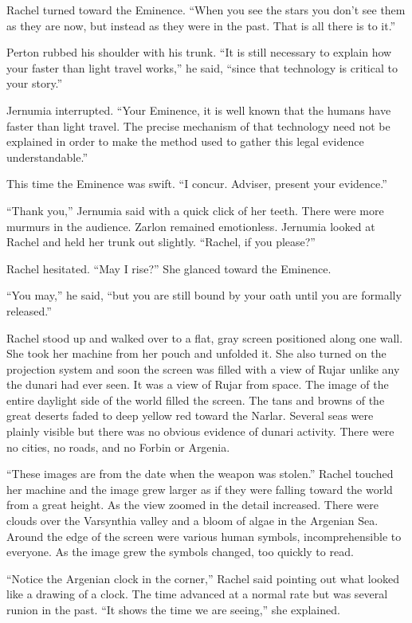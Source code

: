 Rachel turned toward the Eminence. ``When you see the stars you don't see them as they are now,
but instead as they were in the past. That is all there is to it.''

Perton rubbed his shoulder with his trunk. ``It is still necessary to explain how your faster
than light travel works,'' he said, ``since that technology is critical to your story.''

Jernumia interrupted. ``Your Eminence, it is well known that the humans have faster than light
travel. The precise mechanism of that technology need not be explained in order to make the
method used to gather this legal evidence understandable.''

This time the Eminence was swift. ``I concur. Adviser, present your evidence.''

``Thank you,'' Jernumia said with a quick click of her teeth. There were more murmurs in the
audience. Zarlon remained emotionless. Jernumia looked at Rachel and held her trunk out
slightly. ``Rachel, if you please?''

Rachel hesitated. ``May I rise?'' She glanced toward the Eminence.

``You may,'' he said, ``but you are still bound by your oath until you are formally released.''

Rachel stood up and walked over to a flat, gray screen positioned along one wall. She took her
machine from her pouch and unfolded it. She also turned on the projection system and soon the
screen was filled with a view of Rujar unlike any the dunari had ever seen. It was a view of
Rujar from space. The image of the entire daylight side of the world filled the screen. The tans
and browns of the great deserts faded to deep yellow red toward the Narlar. Several seas were
plainly visible but there was no obvious evidence of dunari activity. There were no cities, no
roads, and no Forbin or Argenia.

``These images are from the date when the weapon was stolen.'' Rachel touched her machine and
the image grew larger as if they were falling toward the world from a great height. As the view
zoomed in the detail increased. There were clouds over the Varsynthia valley and a bloom of
algae in the Argenian Sea. Around the edge of the screen were various human symbols,
incomprehensible to everyone. As the image grew the symbols changed, too quickly to read.

``Notice the Argenian clock in the corner,'' Rachel said pointing out what looked like a drawing
of a clock. The time advanced at a normal rate but was several runion in the past. ``It shows
the time we are seeing,'' she explained.

